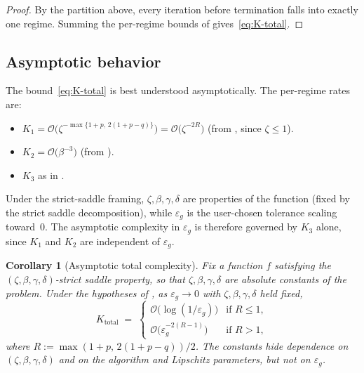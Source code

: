 \documentclass[11pt,a4paper]{article}
\theoremstyle{plain}
\newtheorem{corollary}{Corollary}
\theoremstyle{definition}
\newcommand{\eps}{\varepsilon}
\newcommand{\epsg}{\eps_{g}}
\begin{document}
\begin{proof}
By the partition above, every iteration before termination falls into exactly one regime. Summing the per-regime bounds of  gives~\eqref{eq:K-total}.
\end{proof}

\subsection{Asymptotic behavior}\label{subsec:total-asymptotic}

The bound~\eqref{eq:K-total} is best understood asymptotically. The per-regime rates are:
\begin{itemize}[leftmargin=2.5em]
  \item $K_{1} = \mathcal{O}\bigl(\zeta^{-\max\{1+p,\,2(1+p-q)\}}\bigr) = \mathcal{O}\bigl(\zeta^{-2R}\bigr)$ (from , since $\zeta \leq 1$).
  \item $K_{2} = \mathcal{O}\bigl(\beta^{-3}\bigr)$ (from ).
  \item $K_{3}$ as in .
\end{itemize}
Under the strict-saddle framing, $\zeta, \beta, \gamma, \delta$ are properties of the function (fixed by the strict saddle decomposition), while $\epsg$ is the user-chosen tolerance scaling toward~$0$. The asymptotic complexity in $\epsg$ is therefore governed by $K_{3}$ alone, since $K_{1}$ and $K_{2}$ are independent of $\epsg$.

\begin{corollary}[Asymptotic total complexity]\label{cor:total-asymptotic}
Fix a function $f$ satisfying the $(\zeta, \beta, \gamma, \delta)$-strict saddle property, so that $\zeta, \beta, \gamma, \delta$ are absolute constants of the problem. Under the hypotheses of , as $\epsg \to 0$ with $\zeta, \beta, \gamma, \delta$ held fixed,
\begin{equation}\label{eq:total-asymptotic}
K_{\mathrm{total}} \;=\;
\begin{cases}
\mathcal{O}\bigl(\log(1/\epsg)\bigr) & \text{if } R \leq 1, \\[2pt]
\mathcal{O}\bigl(\epsg^{-2(R-1)}\bigr) & \text{if } R > 1,
\end{cases}
\end{equation}
where $R := \max(1+p,\,2(1+p-q))/2$. The constants hide dependence on $(\zeta, \beta, \gamma, \delta)$ and on the algorithm and Lipschitz parameters, but not on $\epsg$.
\end{corollary}
\end{document}
